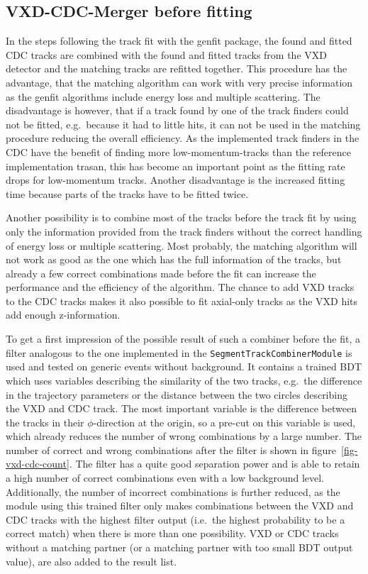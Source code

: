 \subsection{VXD-CDC-Merger before fitting}
In the steps following the track fit with the genfit package, the found and fitted CDC tracks are combined with the found and fitted tracks from the VXD detector and the matching tracks are refitted together. This procedure has the advantage, that the matching algorithm can work with very precise information as the genfit algorithms include energy loss and multiple scattering. The disadvantage is however, that if a track found by one of the track finders could not be fitted, e.g.\ because it had to little hits, it can not be used in the matching procedure reducing the overall efficiency. As the implemented track finders in the CDC have the benefit of finding more low-momentum-tracks than the reference implementation trasan, this has become an important point as the fitting rate drops for low-momentum tracks. Another disadvantage is the increased fitting time because parts of the tracks have to be fitted twice.

Another possibility is to combine most of the tracks before the track fit by using only the information provided from the track finders without the correct handling of energy loss or multiple scattering. Most probably, the matching algorithm will not work as good as the one which has the full information of the tracks, but already a few correct combinations made before the fit can increase the performance and the efficiency of the algorithm. The chance to add VXD tracks to the CDC tracks makes it also possible to fit axial-only tracks as the VXD hits add enough z-information. 

To get a first impression of the possible result of such a combiner before the fit, a filter analogous to the one implemented in the \texttt{SegmentTrackCombinerModule} is used and tested on generic events without background. It contains a trained BDT which uses variables describing the similarity of the two tracks, e.g.\ the difference in the trajectory parameters or the distance between the two circles describing the VXD and CDC track. The most important variable is the difference between the tracks in their $\phi$-direction at the origin, so a pre-cut on this variable is used, which already reduces the number of wrong combinations by a large number. The number of correct and wrong combinations after the filter is shown in figure~\ref{fig-vxd-cdc-count}. The filter has a quite good separation power and is able to retain a high number of correct combinations even with a low background level. Additionally, the number of incorrect combinations is further reduced, as the module using this trained filter only makes combinations between the VXD and CDC tracks with the highest filter output (i.e.\ the highest probability to be a correct match) when there is more than one possibility. VXD or CDC tracks without a matching partner (or a matching partner with too small BDT output value), are also added to the result list. 

